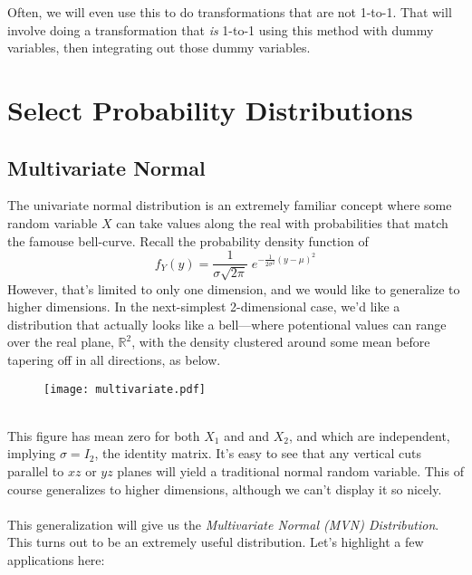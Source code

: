 \documentclass[12pt]{article}
\theoremstyle{plain}
\theoremstyle{definition}
\theoremstyle{remark}
\begin{document}
Often, we will even use this to do transformations that are not
1-to-1. That will involve doing a transformation that \emph{is}
1-to-1 using this method with dummy variables, then integrating
out those dummy variables.


\clearpage
\section{Select Probability Distributions}


\subsection{Multivariate Normal}

The univariate normal distribution is an extremely familiar concept
where some random variable $X$ can take values along the real with
probabilities that match the famouse bell-curve. Recall the probability
density function of
   \[ f_Y(y) = \frac{1}{\sigma \sqrt{2\pi}} \; e^{-\frac{1}{2\sigma^2}
      (y - \mu)^2} \]
However, that's limited to only one dimension, and we would like to
generalize to higher dimensions. In the next-simplest 2-dimensional
case, we'd like a distribution that actually looks like a bell---where
potentional values can range over the real plane, $\mathbb{R}^2$, with
the density clustered around some mean before tapering off in all
directions, as below.
\begin{figure}[h!]
   \centering
   \texttt{[image: multivariate.pdf]}
\end{figure}
\\
This figure has mean zero for both $X_1$ and and $X_2$, and
which are independent, implying $\sigma = I_2$, the identity matrix.
It's easy to see that any vertical cuts parallel to $xz$ or $yz$ planes
will yield a traditional normal random variable. This of course
generalizes to higher dimensions, although we can't display it so nicely.
\\
\\
This generalization will give us the
\emph{Multivariate Normal (MVN) Distribution}.
This turns out to be an extremely useful distribution. Let's highlight
a few applications here:
\end{document}
